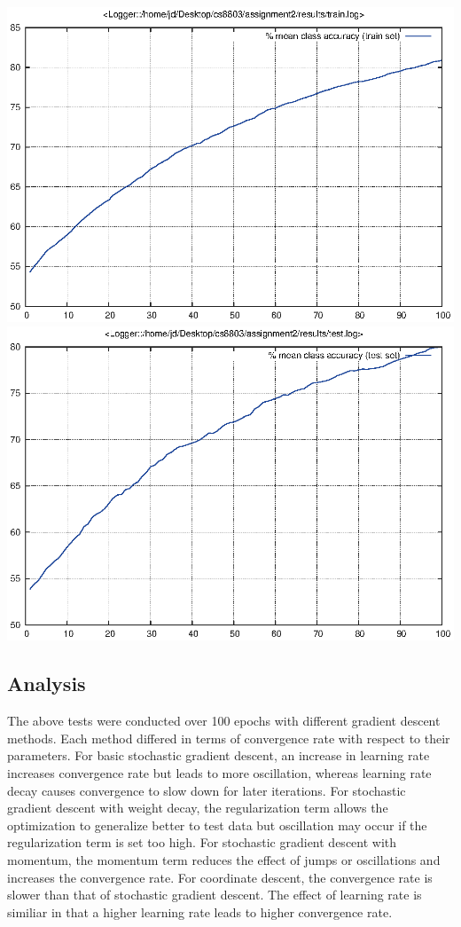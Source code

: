 \documentclass[twoside,12pt]{article}
\newcommand{\imsize}{0.5\linewidth}
\begin{document}
\includegraphics[width=\imsize]{assignment2/results/cd_lr5_train}
\includegraphics[width=\imsize]{assignment2/results/cd_lr5_test}

\subsection{Analysis}

The above tests were conducted over 100 epochs with different gradient descent methods.
Each method differed in terms of convergence rate with respect to their parameters.
For basic stochastic gradient descent, an increase in learning rate increases convergence rate
but leads to more oscillation, whereas learning rate decay causes convergence to slow down
for later iterations.  For stochastic gradient descent with weight decay, the regularization term
allows the optimization to generalize better to test data but oscillation may occur if
the regularization term is set too high. For stochastic gradient descent with momentum, the momentum
term reduces the effect of jumps or oscillations and increases the convergence rate.
For coordinate descent, the convergence rate is slower than that of stochastic gradient descent.
The effect of learning rate is similiar in that a higher learning rate leads to higher convergence rate.
\end{document}
